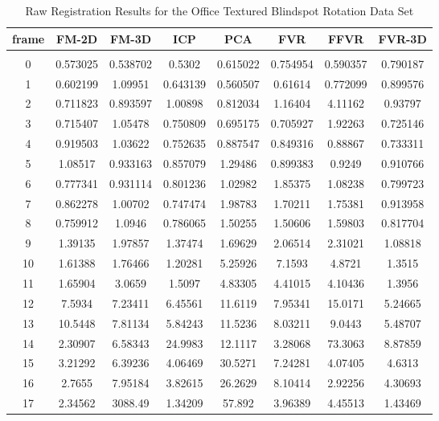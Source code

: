 \begin{center}
\begin{longtable}{cccccccc}
\caption{Raw Registration Results for the Office Textured Blindspot Rotation Data Set}
\label{tab:officetexturedblindspotrotationFULL}
\endfirsthead
\endhead
\textbf{frame} & \textbf{FM-2D} & \textbf{FM-3D} & \textbf{ICP} & \textbf{PCA} & \textbf{FVR} & \textbf{FFVR} & \textbf{FVR-3D} \\
\hline \\
0 & 0.573025 & 0.538702 & 0.5302 & 0.615022 & 0.754954 & 0.590357 & 0.790187\\
1 & 0.602199 & 1.09951 & 0.643139 & 0.560507 & 0.61614 & 0.772099 & 0.899576\\
2 & 0.711823 & 0.893597 & 1.00898 & 0.812034 & 1.16404 & 4.11162 & 0.93797\\
3 & 0.715407 & 1.05478 & 0.750809 & 0.695175 & 0.705927 & 1.92263 & 0.725146\\
4 & 0.919503 & 1.03622 & 0.752635 & 0.887547 & 0.849316 & 0.88867 & 0.733311\\
5 & 1.08517 & 0.933163 & 0.857079 & 1.29486 & 0.899383 & 0.9249 & 0.910766\\
6 & 0.777341 & 0.931114 & 0.801236 & 1.02982 & 1.85375 & 1.08238 & 0.799723\\
7 & 0.862278 & 1.00702 & 0.747474 & 1.98783 & 1.70211 & 1.75381 & 0.913958\\
8 & 0.759912 & 1.0946 & 0.786065 & 1.50255 & 1.50606 & 1.59803 & 0.817704\\
9 & 1.39135 & 1.97857 & 1.37474 & 1.69629 & 2.06514 & 2.31021 & 1.08818\\
10 & 1.61388 & 1.76466 & 1.20281 & 5.25926 & 7.1593 & 4.8721 & 1.3515\\
11 & 1.65904 & 3.0659 & 1.5097 & 4.83305 & 4.41015 & 4.10436 & 1.3956\\
12 & 7.5934 & 7.23411 & 6.45561 & 11.6119 & 7.95341 & 15.0171 & 5.24665\\
13 & 10.5448 & 7.81134 & 5.84243 & 11.5236 & 8.03211 & 9.0443 & 5.48707\\
14 & 2.30907 & 6.58343 & 24.9983 & 12.1117 & 3.28068 & 73.3063 & 8.87859\\
15 & 3.21292 & 6.39236 & 4.06469 & 30.5271 & 7.24281 & 4.07405 & 4.6313\\
16 & 2.7655 & 7.95184 & 3.82615 & 26.2629 & 8.10414 & 2.92256 & 4.30693\\
17 & 2.34562 & 3088.49 & 1.34209 & 57.892 & 3.96389 & 4.45513 & 1.43469\\

\end{longtable}
\end{center}
